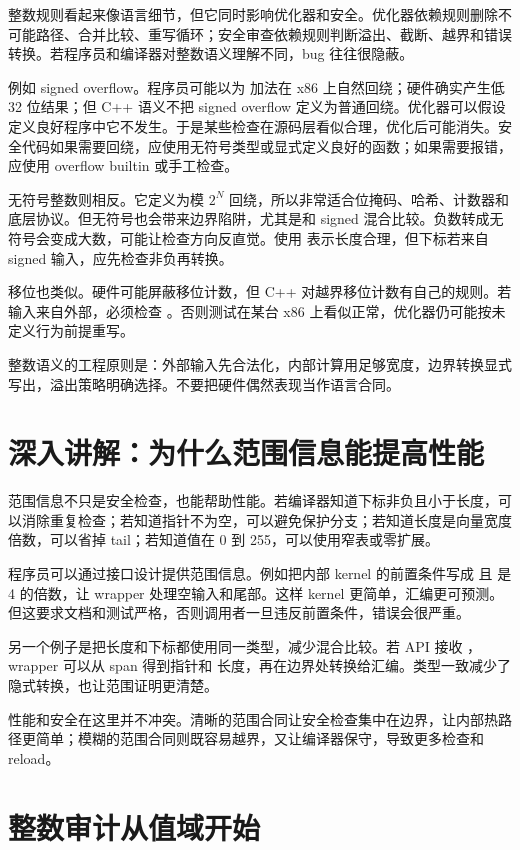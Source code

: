 整数规则看起来像语言细节，但它同时影响优化器和安全。优化器依赖规则删除不可能路径、合并比较、重写循环；安全审查依赖规则判断溢出、截断、越界和错误转换。若程序员和编译器对整数语义理解不同，bug 往往很隐蔽。

例如 signed overflow。程序员可能以为  加法在 x86 上自然回绕；硬件确实产生低 32 位结果；但 C++ 语义不把 signed overflow 定义为普通回绕。优化器可以假设定义良好程序中它不发生。于是某些检查在源码层看似合理，优化后可能消失。安全代码如果需要回绕，应使用无符号类型或显式定义良好的函数；如果需要报错，应使用 overflow builtin 或手工检查。

无符号整数则相反。它定义为模 \(2^N\) 回绕，所以非常适合位掩码、哈希、计数器和底层协议。但无符号也会带来边界陷阱，尤其是和 signed 混合比较。负数转成无符号会变成大数，可能让检查方向反直觉。使用  表示长度合理，但下标若来自 signed 输入，应先检查非负再转换。

移位也类似。硬件可能屏蔽移位计数，但 C++ 对越界移位计数有自己的规则。若输入来自外部，必须检查 。否则测试在某台 x86 上看似正常，优化器仍可能按未定义行为前提重写。

整数语义的工程原则是：外部输入先合法化，内部计算用足够宽度，边界转换显式写出，溢出策略明确选择。不要把硬件偶然表现当作语言合同。

\section{深入讲解：为什么范围信息能提高性能}

范围信息不只是安全检查，也能帮助性能。若编译器知道下标非负且小于长度，可以消除重复检查；若知道指针不为空，可以避免保护分支；若知道长度是向量宽度倍数，可以省掉 tail；若知道值在 0 到 255，可以使用窄表或零扩展。

程序员可以通过接口设计提供范围信息。例如把内部 kernel 的前置条件写成  且  是 4 的倍数，让 wrapper 处理空输入和尾部。这样 kernel 更简单，汇编更可预测。但这要求文档和测试严格，否则调用者一旦违反前置条件，错误会很严重。

另一个例子是把长度和下标都使用同一类型，减少混合比较。若 API 接收 ，wrapper 可以从 span 得到指针和  长度，再在边界处转换给汇编。类型一致减少了隐式转换，也让范围证明更清楚。

性能和安全在这里并不冲突。清晰的范围合同让安全检查集中在边界，让内部热路径更简单；模糊的范围合同则既容易越界，又让编译器保守，导致更多检查和 reload。

\section{整数审计从值域开始}

